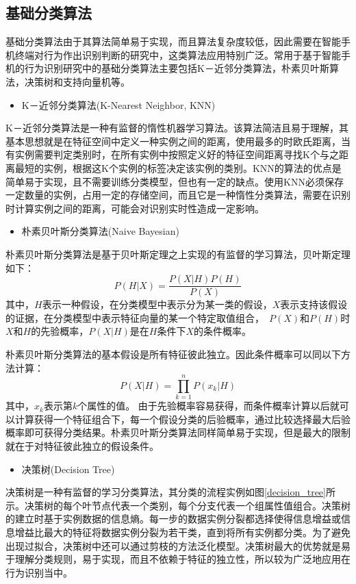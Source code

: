 \subsection{基础分类算法}
\par 基础分类算法由于其算法简单易于实现，而且算法复杂度较低，因此需要在智能手机终端对行为作出识别判断的研究中，这类算法应用特别广泛。常用于基于智能手机的行为识别研究中的基础分类算法主要包括K－近邻分类算法，朴素贝叶斯算法，决策树和支持向量机等。

\begin{itemize}
	\item K－近邻分类算法(K-Nearest Neighbor, KNN)
\end{itemize}
\par K－近邻分类算法是一种有监督的惰性机器学习算法。该算法简洁且易于理解，其基本思想就是在特征空间中定义一种实例之间的距离，使用最多的时欧氏距离，当有实例需要判定类别时，在所有实例中按照定义好的特征空间距离寻找K个与之距离最短的实例，根据这K个实例的标签决定该实例的类别。KNN的算法的优点是简单易于实现，且不需要训练分类模型，但也有一定的缺点。使用KNN必须保存一定数量的实例，占用一定的存储空间，而且它是一种惰性分类算法，需要在识别时计算实例之间的距离，可能会对识别实时性造成一定影响。
\begin{itemize}
	\item 朴素贝叶斯分类算法(Naive Bayesian)
\end{itemize}
\par 朴素贝叶斯分类算法是基于贝叶斯定理之上实现的有监督的学习算法，贝叶斯定理如下：
\begin{equation}
	P(H|X) = \frac{P(X|H)P(H)}{P(X)}
\end{equation}
其中，$H$表示一种假设，在分类模型中表示分为某一类的假设，$X$表示支持该假设的证据，在分类模型中表示特征向量的某一个特定取值组合，　$P(X)$和$P(H)$时$X$和$H$的先验概率，$P(X|H)$是在$H$条件下$X$的条件概率。
\par 朴素贝叶斯分类算法的基本假设是所有特征彼此独立。因此条件概率可以同以下方法计算：
\begin{equation}
	P(X|H) = \prod_{k=1}^{n}P(x_k|H)
\end{equation}
其中，$x_k$表示第$k$个属性的值。
由于先验概率容易获得，而条件概率计算以后就可以计算获得一个特征组合下，每一个假设分类的后验概率，通过比较选择最大后验概率即可获得分类结果。朴素贝叶斯分类算法同样简单易于实现，但是最大的限制就在于对特征彼此独立的假设条件。

\begin{itemize}
	\item 决策树(Decision Tree)
\end{itemize}
\par 决策树是一种有监督的学习分类算法，其分类的流程实例如图\ref{decision_tree}所示。决策树的每个叶节点代表一个类别，每个分支代表一个组属性值组合。决策树的建立时基于实例数据的信息熵。每一步的数据实例分裂都选择使得信息增益或信息增益比最大的特征将数据实例分裂为若干类，直到将所有实例都分类。为了避免出现过拟合，决策树中还可以通过剪枝的方法泛化模型。决策树最大的优势就是易于理解分类规则，易于实现，而且不依赖于特征的独立性，所以较为广泛地应用在行为识别当中。

